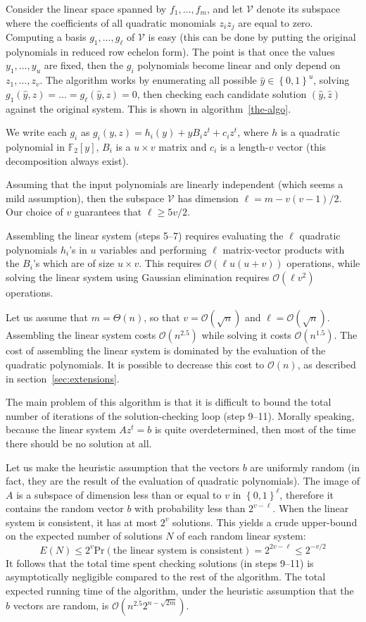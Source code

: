 \documentclass[a4paper,UKenglish,cleveref, autoref]{lipics-v2019}
\newcommand{\bits}{\left\{0, 1\right\}}
\newcommand{\bigO}[1]{\ensuremath{\mathcal{O}\left( #1 \right)} }
\newcommand{\bigTheta}[1]{\ensuremath{\Theta\left( #1 \right)} }
\begin{document}
Consider the linear space spanned by $f_1, \dots, f_m$, and let $\mathcal{V}$
denote its subspace where the coefficients of all quadratic monomials $z_i z_j$
are equal to zero. Computing a basis $g_1, \dots, g_\ell$ of $\mathcal{V}$ is
easy (this can be done by putting the original polynomials in reduced row
echelon form). The point is that once the values $y_1, \dots, y_u$ are fixed,
then the $g_i$ polynomials become linear and only depend on $z_1, \dots,
z_v$. The algorithm works by enumerating all possible $\hat y \in \bits^u$,
solving $g_1(\hat y, z) = \dots = g_\ell(\hat y, z) = 0$, then checking each
candidate solution $(\hat y, \hat z)$ against the original system. This is shown
in algorithm~\ref{the-algo}.

We write each $g_i$ as $g_i(y, z) = h_i(y) + y B_i z^t + c_i z^t$, where
$h$ is a quadratic polynomial in $\mathbb{F}_2[y]$, $B_i$ is a $u \times v$
matrix and $c_i$ is a length-$v$ vector (this decomposition always exist).

Assuming that the input polynomials are linearly independent (which seems a mild
assumption), then the subspace $\mathcal{V}$ has dimension
$\ell = m - v(v-1)/2$. Our choice of $v$ guarantees that $\ell \geq 5v/2$.

Assembling the linear system (steps 5--7) requires evaluating the $\ell$
quadratic polynomials $h_i$'s in $u$ variables and performing $\ell$
matrix-vector products with the $B_i$'s which are of size $u \times v$.  This
requires $\bigO{\ell u(u+v)}$ operations, while solving the linear system using
Gaussian elimination requires $\bigO{\ell v^2}$ operations.

Let us assume that $m = \bigTheta{n}$, so that $v = \bigO{\sqrt{n}}$ and
$\ell = \bigO{\sqrt{n}}$. Assembling the linear system costs $\bigO{n^{2.5}}$
while solving it costs $\bigO{n^{1.5}}$. The cost of assembling the linear
system is dominated by the evaluation of the quadratic polynomials. It is
possible to decrease this cost to $\bigO{n}$, as described in
section~\ref{sec:extensions}.

The main problem of this algorithm is that it is difficult to bound the total
number of iterations of the solution-checking loop (step 9--11). Morally
speaking, because the linear system $A z^t = b$ is quite overdetermined, then most
of the time there should be no solution at all.

Let us make the heuristic assumption that the vectors $b$ are uniformly random
(in fact, they are the result of the evaluation of quadratic polynomials). The
image of $A$ is a subspace of dimension less than or equal to $v$ in
$\bits^\ell$, therefore it contains the random vector $b$ with probability less
than $2^{v-\ell}$. When the linear system is consistent, it has at most $2^v$
solutions. This yields a crude upper-bound on the expected number of solutions
$N$ of each random linear system:
\[
  E(N) \leq 2^v \mathrm{Pr}(\text{the linear system is consistent}) = 2^{2v - \ell} \leq 2^{-v/2}
\]
It follows that the total time spent checking solutions (in steps 9--11) is
asymptotically negligible compared to the rest of the algorithm.  The total
expected running time of the algorithm, under the heuristic assumption that the
$b$ vectors are random, is $\bigO{n^{2.5} 2^{n - \sqrt{2m}}}$.
\end{document}
